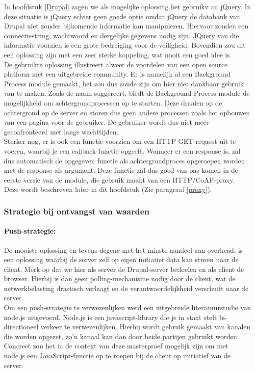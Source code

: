 In hoofdstuk \ref{Drupal} zagen we als mogelijke oplossing het gebruikv an jQuery. In deze situatie is jQuery echter geen goede optie omdat jQuery de databank van Drupal niet zonder bijkomende informatie kan manipuleren. Hiervoor zouden een connectiestring, wachtwoord en dergelijke gegevens nodig zijn. JQuery van die informatie voorzien is een grote bedreiging voor de veiligheid. Bovendien zou dit een oplossing zijn met een zeer sterke koppeling, wat nooit een goed idee is.\\
De gebruikte oplossing illustreert alweer de voordelen van een open source platform met een uitgebreide community. Er is namelijk al een Background Process module gemaakt, het zou dus zonde zijn om hier niet dankbaar gebruik van te maken. Zoals de naam suggereert, biedt de Background Process module de mogelijkheid om achtergrondprocessen op te starten. Deze draaien op de achtergrond op de server en storen dus geen andere processen zoals het opbouwen van een pagina voor de gebruiker. De gebruiker wordt dus niet meer geconfronteerd met lange wachttijden.\\
Sterker nog, er is ook een functie voorzien om een HTTP GET-request uit te voeren, waarbij je een callback-functie opgeeft. Wanneer er een response is, zal dus automatisch de opgegeven functie als achtergrondproces opgeroepen worden met de response als argument. Deze functie zal dus goed van pas komen in de eerste versie van de module, die gebruik maakt van een HTTP/CoAP-proxy. Deze wordt beschreven later in dit hoofdstuk (Zie paragraaf \ref{proxy}).

\subsubsection{Strategie bij ontvangst van waarden}
\paragraph{Push-strategie:}

De mooiste oplossing en tevens degene met het minste aandeel aan overhead, is een oplossing waarbij de server zelf op eigen initiatief data kan sturen naar de client. Merk op dat we hier als server de Drupal-server bedoelen en als client de browser. Hierbij is dan geen polling-mechanisme nodig door de client, wat de netwerkbelasting drastisch verlaagt en de verantwoordelijkheid verschuift naar de server.\\
Om een push-strategie te verwezenlijken werd een uitgebreide literatuurstudie van node.js uitgevoerd. Node.js is een javascript-library die je in staat stelt bi-directioneel verkeer te verwezenlijken. Hierbij wordt gebruik gemaakt van kanalen die worden opgezet, zo'n kanaal kan dan door beide partijen gebruikt worden.\\
Concreet zou het in de context van deze masterproef mogelijk zijn om met node.js een JavaScript-functie op te roepen bij de client op initiatief van de server.\\

